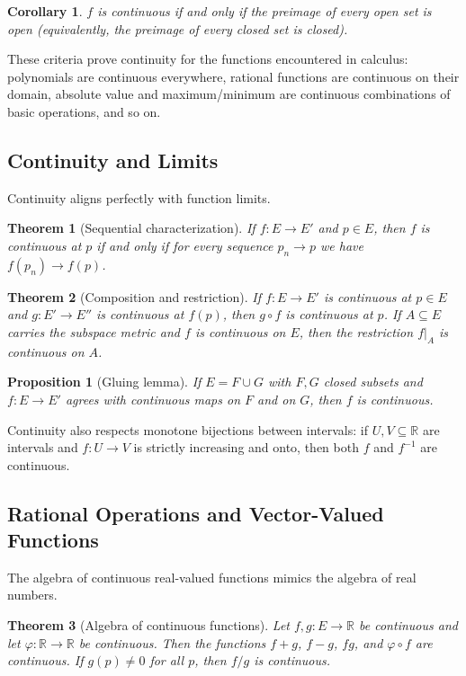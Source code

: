 \documentclass{article}
\theoremstyle{definition}
\theoremstyle{plain}
\newtheorem{theorem}{Theorem}[section]
\newtheorem{proposition}{Proposition}[section]
\newtheorem{corollary}{Corollary}[theorem]
\begin{document}
\begin{corollary}\label{cor:preimage-open-closed}
	$f$ is continuous if and only if the preimage of every open set is open (equivalently, the preimage of every closed set is closed).
\end{corollary}

These criteria prove continuity for the functions encountered in calculus: polynomials are continuous everywhere, rational functions are continuous on their domain, absolute value and maximum/minimum are continuous combinations of basic operations, and so on.

\subsection{Continuity and Limits}\label{subsec:continuity-limits}
Continuity aligns perfectly with function limits.
\begin{theorem}[Sequential characterization]\label{thm:cont-limit}
	If $f\colon E\to E'$ and $p\in E$, then $f$ is continuous at $p$ if and only if for every sequence $p_n\to p$ we have $f(p_n)\to f(p)$.
\end{theorem}

\begin{theorem}[Composition and restriction]\label{thm:composition}
	If $f\colon E\to E'$ is continuous at $p\in E$ and $g\colon E'\to E''$ is continuous at $f(p)$, then $g\circ f$ is continuous at $p$. If $A\subseteq E$ carries the subspace metric and $f$ is continuous on $E$, then the restriction $f|_A$ is continuous on $A$.
\end{theorem}

\begin{proposition}[Gluing lemma]\label{prop:gluing}
	If $E=F\cup G$ with $F,G$ closed subsets and $f\colon E\to E'$ agrees with continuous maps on $F$ and on $G$, then $f$ is continuous.
\end{proposition}

Continuity also respects monotone bijections between intervals: if $U,V\subseteq \mathbb{R}$ are intervals and $f\colon U\to V$ is strictly increasing and onto, then both $f$ and $f^{-1}$ are continuous.

\subsection{Rational Operations and Vector-Valued Functions}\label{subsec:rational-operations}
The algebra of continuous real-valued functions mimics the algebra of real numbers.
\begin{theorem}[Algebra of continuous functions]\label{thm:rational-ops}
	Let $f,g\colon E\to \mathbb{R}$ be continuous and let $\varphi\colon \mathbb{R}\to \mathbb{R}$ be continuous. Then the functions $f+g$, $f-g$, $fg$, and $\varphi\circ f$ are continuous. If $g(p)\neq 0$ for all $p$, then $f/g$ is continuous.
\end{theorem}
\end{document}
